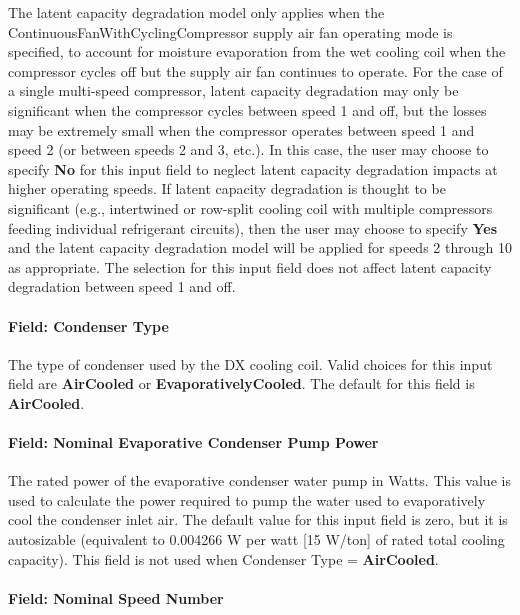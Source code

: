 The latent capacity degradation model only applies when the ContinuousFanWithCyclingCompressor supply air fan operating mode is specified, to account for moisture evaporation from the wet cooling coil when the compressor cycles off but the supply air fan continues to operate. For the case of a single multi-speed compressor, latent capacity degradation may only be significant when the compressor cycles between speed 1 and off, but the losses may be extremely small when the compressor operates between speed 1 and speed 2 (or between speeds 2 and 3, etc.). In this case, the user may choose to specify \textbf{No} for this input field to neglect latent capacity degradation impacts at higher operating speeds. If latent capacity degradation is thought to be significant (e.g., intertwined or row-split cooling coil with multiple compressors feeding individual refrigerant circuits), then the user may choose to specify \textbf{Yes} and the latent capacity degradation model will be applied for speeds 2 through 10 as appropriate. The selection for this input field does not affect latent capacity degradation between speed 1 and off.

\paragraph{Field: Condenser Type}

The type of condenser used by the DX cooling coil. Valid choices for this input field are \textbf{AirCooled} or \textbf{EvaporativelyCooled}. The default for this field is \textbf{AirCooled}.

\paragraph{Field: Nominal Evaporative Condenser Pump Power}\label{field-nominal-evaporative-condenser-pump-power-1}

The rated power of the evaporative condenser water pump in Watts. This value is used to calculate the power required to pump the water used to evaporatively cool the condenser inlet air. The default value for this input field is zero, but it is autosizable (equivalent to 0.004266 W per watt {[}15 W/ton{]} of rated total cooling capacity). This field is not used when Condenser Type = \textbf{AirCooled}.

\paragraph{Field: Nominal Speed Number}\label{field-nominal-speed-number}

